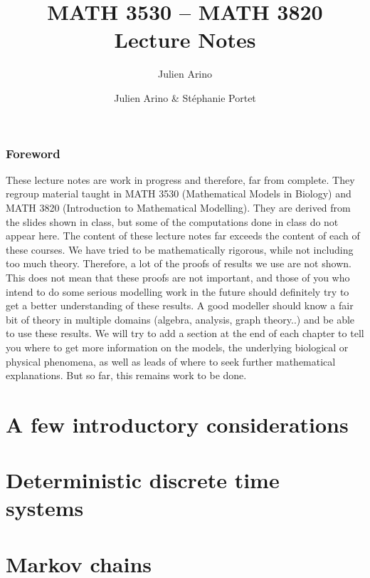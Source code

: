 \documentclass[12pt]{report}
\author{Julien Arino}
\title{MATH 3530 -- MATH 3820\\ Lecture Notes}
\author{Julien Arino \& St\'ephanie Portet}
\theoremstyle{plain}
\begin{document}
\maketitle

\cfoot{}

\section*{Foreword}
These lecture notes are work in progress and therefore, far from complete. They regroup material taught in MATH 3530 (Mathematical Models in Biology) and  MATH 3820 (Introduction to Mathematical Modelling).
They are derived from the slides shown in class, but some of the computations done in class do not appear here. The content of these lecture notes far exceeds the content of each of these courses.
\vskip0.5cm
We have tried to be mathematically rigorous, while not including too much theory. Therefore, a lot of the proofs of results we use are not shown. This does not mean that these proofs are not important, and those of you who intend to do some serious modelling work in the future should definitely try to get a better understanding of these results. A good modeller should know a fair bit of theory in multiple domains (algebra, analysis, graph theory..) and be able to use these results.
\vskip0.5cm
We will try to add a section at the end of each chapter to tell you where to get more information on the models, the underlying biological or physical phenomena, as well as leads of where to seek further mathematical explanations. But so far, this remains work to be done.
\tableofcontents

\rhead{\thepage}

%
\part{A few introductory considerations}





\part{Deterministic discrete time systems} 



\part{Markov chains}


\end{document}
